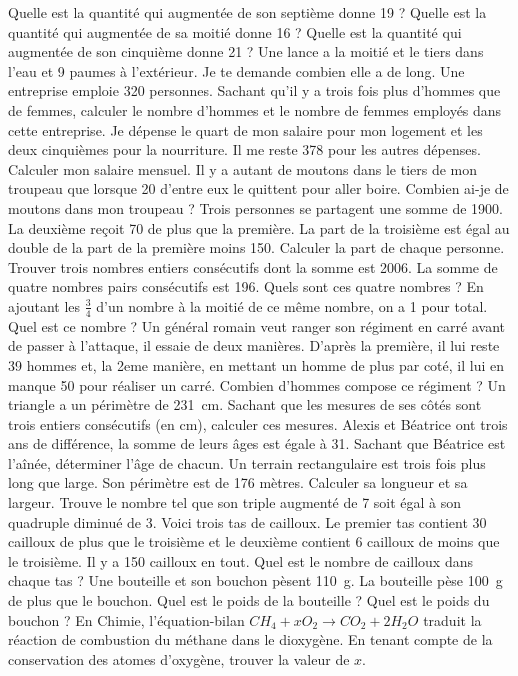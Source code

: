 \documentclass["../Cours.tex"]{subfiles}
\begin{document}
\begin{questions}
    \exercice Quelle est la quantité qui augmentée de son septième donne 19 ?
    \exercice Quelle est la quantité qui augmentée de sa moitié donne 16 ? 
    \exercice Quelle est la quantité qui augmentée de son cinquième donne 21 ?
    \exercice Une lance a la moitié et le tiers dans l'eau et 9 paumes à l'extérieur. Je te demande combien elle a de long.
    \exercice Une entreprise emploie 320 personnes. Sachant qu'il y a trois fois plus d'hommes que de femmes, calculer le nombre d'hommes et le nombre de femmes employés dans cette entreprise.
    \exercice Je dépense le quart de mon salaire pour mon logement et les deux cinquièmes pour la nourriture. Il me reste \qty{378}{\EURO} pour les autres dépenses. Calculer mon salaire mensuel.
    \exercice Il y a autant de moutons dans le tiers de mon troupeau que lorsque 20 d'entre eux le quittent pour aller boire. Combien ai-je de moutons dans mon troupeau ?
    \exercice Trois personnes se partagent une somme de \qty{1900}{\EURO}. La deuxième reçoit \qty{70}{\EURO} de plus que la première. La part de la troisième est égal au double de la part de la première moins \qty{150}{\EURO}. Calculer la part de chaque personne.
    \exercice Trouver trois nombres entiers consécutifs dont la somme est 2006.
    \exercice La somme de quatre nombres pairs consécutifs est 196. Quels sont ces quatre nombres ?
    \exercice En ajoutant les $\frac{3}{4}$ d'un nombre à la moitié de ce même nombre, on a 1 pour total. Quel est ce nombre ?
    \exercice Un général romain veut ranger son régiment en carré avant de passer à l'attaque, il essaie de deux manières. D'après la première, il lui reste 39 hommes et, la 2eme manière, en mettant un homme de plus par coté, il lui en manque 50 pour réaliser un carré. Combien d'hommes compose ce régiment ?
    \exercice Un triangle a un périmètre de \qty{231}{\centi\metre}. Sachant que les mesures de ses côtés sont trois entiers consécutifs (en \unit{\centi\metre}), calculer ces mesures.
    \exercice Alexis et Béatrice ont trois ans de différence, la somme de leurs âges est égale à 31. Sachant que Béatrice est l’aînée, déterminer l’âge de chacun.
    \exercice Un terrain rectangulaire est trois fois plus long que large. Son périmètre est de 176 mètres. Calculer sa longueur et sa largeur.
    \exercice Trouve le nombre tel que son triple augmenté de 7 soit égal à son quadruple diminué de 3.
    \exercice Voici trois tas de cailloux. Le premier tas contient 30 cailloux de plus que le troisième et le deuxième contient 6 cailloux de moins que le troisième. Il y a 150 cailloux en tout. Quel est le nombre de cailloux dans chaque tas ?
    \exercice Une bouteille et son bouchon pèsent \qty{110}{\gram}. La bouteille pèse \qty{100}{\gram} de plus que le bouchon. Quel est le poids de la bouteille ? Quel est le poids du bouchon ?
    \exercice En Chimie, l'équation-bilan $CH_4 + x O_2 \longrightarrow CO_2 + 2 H_2O$ traduit la réaction de combustion du méthane dans le dioxygène. En tenant compte de la conservation des atomes d'oxygène, trouver la valeur de $x$.


\end{questions}
\end{document}
